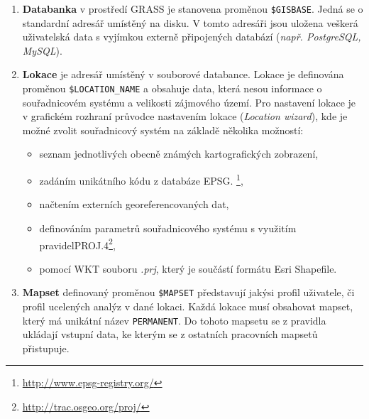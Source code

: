\documentclass[a4paper,12pt,oneside]{report}
\begin{document}
\begin{enumerate}
\item \textbf{Databanka} v prostředí GRASS je stanovena proměnou
  \texttt{\$GISBASE}. Jedná se o standardní adresář umístěný na disku.
  V tomto adresáři jsou uložena veškerá uživatelská data s vyjímkou
  externě připojených databází (\textit{např. PostgreSQL, MySQL}).

\item \textbf{Lokace} je adresář umístěný v souborové
  databance. Lokace je definována proměnou \texttt{\$LOCATION\_NAME} a
  obsahuje data, která nesou informace o souřadni\-covém systému a
  velikosti zájmového území. Pro nastavení lokace je v grafickém
  rozhraní průvodce nastavením lokace (\textit{Location wizard}), kde
  je možné zvolit souřadnicový systém na základě několika možností:
\begin{itemize}
\item seznam jednotlivých obecně známých kartografických zobrazení, 
\item zadáním unikátního kódu z databáze    \acs{EPSG}. \footnote{\url{http://www.epsg-registry.org/}},
\item načtením externích georeferencovaných dat,
\item definováním parametrů souřadnicového systému s využitím pravidel\newline PROJ.4\footnote{\url{http://trac.osgeo.org/proj/}},
\item pomocí \ac{WKT} souboru \emph{.prj}, který je součástí formátu Esri Shapefile.
\end{itemize}

\item \textbf{Mapset} definovaný proměnou \texttt{\$MAPSET}
  představují jakýsi profil uživatele, či profil ucelených analýz v
  dané lokaci. Každá lokace musí obsahovat mapset, který má unikátní
  název \texttt{PERMANENT}. Do tohoto mapsetu se z pravidla ukládají
  vstupní data, ke kterým se z ostatních pracovních mapsetů
  přistupuje.
\end{enumerate}
\end{document}
